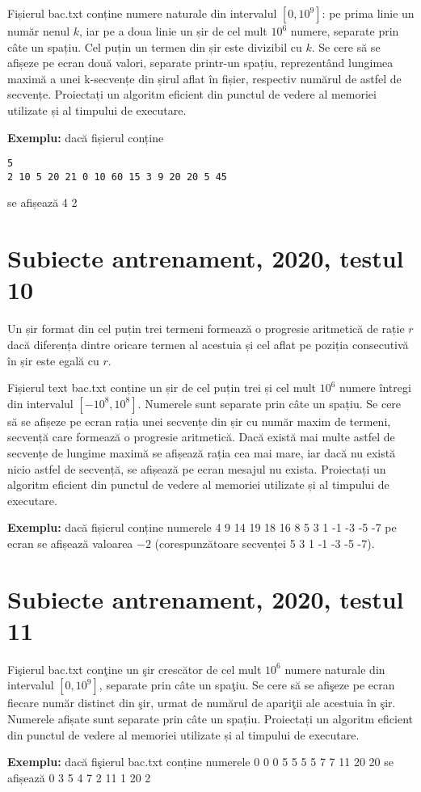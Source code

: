 \documentclass[10pt, a4paper]{article}
\newcommand{\highlight}[1]{{\ttfamily\color{red}#1}}
\begin{document}
\vspace{0.2cm}
\noindent Fișierul \highlight{bac.txt} conține numere naturale din intervalul \highlight{$[0,10^9]$}: pe prima linie un număr nenul \highlight{$k$}, iar pe a doua linie un șir de cel mult \highlight{$10^6$} numere, separate prin câte un spațiu. Cel puțin un termen din șir este divizibil cu \highlight{$k$}. Se cere să se afișeze pe ecran două valori, separate printr-un spațiu, reprezentând lungimea maximă a unei k-secvențe din șirul aflat în fișier, respectiv numărul de astfel de secvențe. Proiectați un algoritm eficient din punctul de vedere al memoriei utilizate și al timpului de executare.

\vspace{0.2cm}
\noindent \textbf{Exemplu:} dacă fișierul conține
\begin{verbatim}
5
2 10 5 20 21 0 10 60 15 3 9 20 20 5 45
\end{verbatim}
se afișează \highlight{4 2}

\section{Subiecte antrenament, 2020, testul 10}
Un șir format din cel puțin trei termeni formează o progresie aritmetică de rație \highlight{$r$} dacă diferența dintre oricare termen al acestuia și cel aflat pe poziția consecutivă în șir este egală cu \highlight{$r$}.

\vspace{0.2cm}
\noindent Fișierul text \highlight{bac.txt} conține un șir de cel puțin trei și cel mult \highlight{$10^6$} numere întregi din intervalul \highlight{$[-10^8,10^8]$}. Numerele sunt separate prin câte un spațiu. Se cere să se afișeze pe ecran rația unei secvențe din șir cu număr maxim de termeni, secvență care formează o progresie aritmetică. Dacă există mai multe astfel de secvențe de lungime maximă se afișează rația cea mai mare, iar dacă nu există nicio astfel de secvență, se afișează pe ecran mesajul \highlight{nu exista}. Proiectați un algoritm eficient din punctul de vedere al memoriei utilizate și al timpului de executare.

\vspace{0.2cm}
\noindent \textbf{Exemplu:} dacă fișierul conține numerele \highlight{4 9 14 19 18 16 8 5 3 1 -1 -3 -5 -7} pe ecran se afișează valoarea \highlight{$-2$} (corespunzătoare secvenței \highlight{5 3 1 -1 -3 -5 -7}).

\section{Subiecte antrenament, 2020, testul 11}
Fişierul bac.txt conţine un şir crescător de cel mult \highlight{$10^6$} numere naturale din intervalul \highlight{$[0,10^9]$}, separate prin câte un spaţiu. Se cere să se afişeze pe ecran fiecare număr distinct din şir, urmat de numărul de apariţii ale acestuia în şir. Numerele afișate sunt separate prin câte un spațiu. Proiectați un algoritm eficient din punctul de vedere al memoriei utilizate și al timpului de executare.

\vspace{0.2cm}
\noindent \textbf{Exemplu:} dacă fişierul \highlight{bac.txt} conține numerele \highlight{0 0 0 5 5 5 5 7 7 11 20 20} se afișează \highlight{0 3 5 4 7 2 11 1 20 2}
\end{document}
